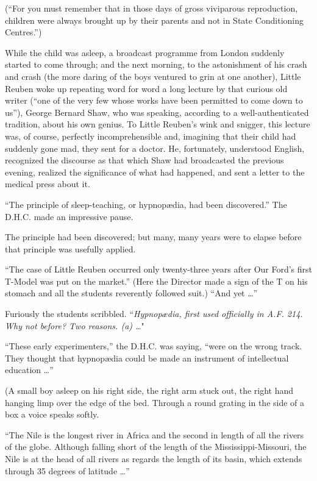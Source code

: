 \documentclass[12pt]{report}
\begin{document}
(``For you must remember that in those days of gross viviparous
reproduction, children were always brought up by their parents and not
in State Conditioning Centres.'')

While the child was asleep, a broadcast programme from London suddenly
started to come through; and the next morning, to the astonishment of
his crash and crash (the more daring of the boys ventured to grin at one
another), Little Reuben woke up repeating word for word a long lecture
by that curious old writer (``one of the very few whose works have been
permitted to come down to us''), George Bernard Shaw, who was speaking,
according to a well-authenticated tradition, about his own genius. To
Little Reuben's wink and snigger, this lecture was, of course, perfectly
incomprehensible and, imagining that their child had suddenly gone mad,
they sent for a doctor. He, fortunately, understood English, recognized
the discourse as that which Shaw had broadcasted the previous evening,
realized the significance of what had happened, and sent a letter to the
medical press about it.

``The principle of sleep-teaching, or hypnopædia, had been discovered.''
The D.H.C. made an impressive pause.

The principle had been discovered; but many, many years were to elapse
before that principle was usefully applied.

``The case of Little Reuben occurred only twenty-three years after Our
Ford's first T-Model was put on the market.'' (Here the Director made a
sign of the T on his stomach and all the students reverently followed
suit.) ``And yet \ldots{}''

Furiously the students scribbled. ``\emph{Hypnopædia, first used
officially in A.F. 214. Why not before? Two reasons. (a) \ldots{}}"

``These early experimenters,'' the D.H.C. was saying, ``were on the
wrong track. They thought that hypnopædia could be made an instrument of
intellectual education \ldots{}''

(A small boy asleep on his right side, the right arm stuck out, the
right hand hanging limp over the edge of the bed. Through a round
grating in the side of a box a voice speaks softly.

``The Nile is the longest river in Africa and the second in length of
all the rivers of the globe. Although falling short of the length of the
Mississippi-Missouri, the Nile is at the head of all rivers as regards
the length of its basin, which extends through 35 degrees of latitude
\ldots{}''
\end{document}
